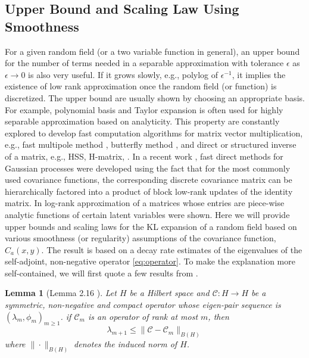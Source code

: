 \documentclass[11pt]{amsart}
\newtheorem{lemma}{Lemma}[section]
\begin{document}
\subsection{Upper Bound and Scaling Law Using Smoothness}
For a given random field (or a two variable function in general), an upper bound for the number of terms needed in a separable approximation with tolerance $\epsilon$ as $\epsilon\rightarrow 0$ is also very useful. If it grows slowly, e.g., polylog of $\epsilon^{-1}$, it implies the existence of low rank approximation once the random field (or function) is discretized. The upper bound are usually shown by choosing an appropriate basis. For example, polynomial basis and Taylor expansion is often used for highly separable approximation based on analyticity. This property are constantly explored to develop fast computation algorithms for matrix vector multiplication, e.g., fast multipole method \cite{greengard1987fast,greengard1988rapid, rokhlin1990rapid}, butterfly method \cite{candes2009fast, michielssen1996multilevel}, and direct or structured inverse of a matrix, e.g., HSS, H-matrix, \cite{bebendorf2003existence, borm2010approximation,ho2016hierarchical, martinsson2009fast, schmitz2012fast, xia2013efficient}. 
In a recent work \cite{ambikasaran2014fast}, fast direct methods for Gaussian processes were developed using the fact that for the most commonly used
covariance functions, the corresponding discrete covariance matrix
can be hierarchically factored into a product of block low-rank updates of the identity matrix.  In \cite{udell2017nice}  log-rank approximation of a matrices whose entries are piece-wise analytic functions of certain latent variables were shown. Here we will provide upper bounds and scaling laws for the KL expansion of a random field based on 
various smoothness (or regularity) assumptions of the covariance function, $C_a(x,y)$. The result is based on a decay rate estimates of the eigenvalues of the self-adjoint, non-negative operator \eqref{eq:operator}. To make the explanation more self-contained, we will first quote a few results from \cite{schwab2006karhunen}. 

\begin{lemma}[Lemma 2.16 \cite{schwab2006karhunen}]
\label{le:1}
Let $H$ be a Hilbert space and $\mathcal{C}:H\to H$ be a symmetric, non-negative and compact operator whose eigen-pair sequence is $(\lambda_m,\phi_m)_{m\ge 1}$. if $\mathcal{C}_m$ is an operator of rank at most $m$, then 
\begin{equation}
\lambda_{m+1}\le \|\mathcal{C}-\mathcal{C}_m\|_{B(H)}
\end{equation}
where $\|\cdot \|_{B(H)}$ denotes the induced norm of $H$. 
\end{lemma}
\end{document}
